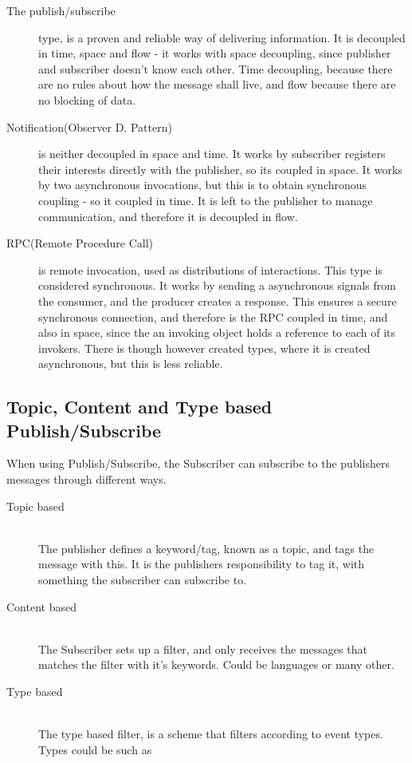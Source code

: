 \begin{description}
\item[The publish/subscribe] type, is a proven and reliable way of delivering information. It is decoupled in time, space and flow - it works with space decoupling, since publisher and subscriber doesn't know each other. Time decoupling, because there are no rules about how the message shall live, and flow because there are no blocking of data. \\

\item[Notification(Observer D. Pattern)] is neither decoupled in space and time. It works by subscriber registers their interests directly with the publisher, so its coupled in space. It works by two asynchronous invocations, but this is to obtain synchronous coupling - so it coupled in time. It is left to the publisher to manage communication, and therefore it is decoupled in flow.\\

\item[RPC(Remote Procedure Call)] is remote invocation, used as distributions of interactions. This type is considered synchronous. It works by sending a asynchronous signals from the consumer, and the producer creates a response. This ensures a secure synchronous connection, and therefore is the RPC coupled in time, and also in space, since the an invoking object holds a reference to each of its invokers. There is though however created types, where it is created asynchronous, but this is less reliable.\\
    
\end{description}

\subsection{Topic, Content and Type based Publish/Subscribe}
When using Publish/Subscribe, the Subscriber can subscribe to the publishers messages through different ways.

\begin{description}
    \item[Topic based] \hfill \\
 The publisher defines a keyword/tag, known as a topic, and tags the message with this. It is the publishers responsibility to tag it, with something the subscriber can subscribe to.
    \item[Content based] \hfill \\
 The Subscriber sets up a filter, and only receives the messages that matches the filter with it's keywords. Could be languages or many other.
    \item[Type based] \hfill \\
 The type based filter, is a scheme that filters according to event types. Types could be such as
 \end{description} 